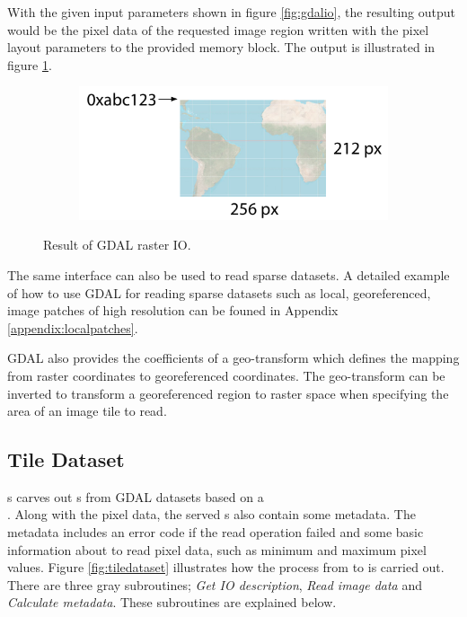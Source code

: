 With the given input parameters shown in figure \ref{fig:gdalio}, the resulting output would be the pixel data of the requested image region written with the pixel layout parameters to the provided memory block. The output is illustrated in figure \ref{fig:gdalioresult}.

\begin{figure}[htbp]
    \centering
    \begin{subfigure}[bt]{0.5\textwidth}
        \includegraphics[width=\textwidth]{figures/implementation/pipeline/gdalioresult.pdf}
    \end{subfigure}
    \caption{Result of GDAL raster IO.}
    \label{fig:gdalioresult}
\end{figure}

The same interface can also be used to read sparse datasets. A detailed example of how to use GDAL for reading sparse datasets such as local, georeferenced, image patches of high resolution can be founed in Appendix \ref{appendix:localpatches}.

GDAL also provides the coefficients of a geo-transform which defines the mapping from raster coordinates to georeferenced coordinates. The geo-transform can be inverted to transform a georeferenced region to raster space when specifying the area of an image tile to read.

\subsection{Tile Dataset}
s carves out s from GDAL datasets based on a \\ . Along with the pixel data, the served s also contain some metadata. The metadata includes an error code if the read operation failed and some basic information about to read pixel data, such as minimum and maximum pixel values. Figure \ref{fig:tiledataset} illustrates how the process from  to  is carried out. There are three gray subroutines; \emph{Get IO description}, \emph{Read image data} and \emph{Calculate metadata}. These subroutines are explained below.

